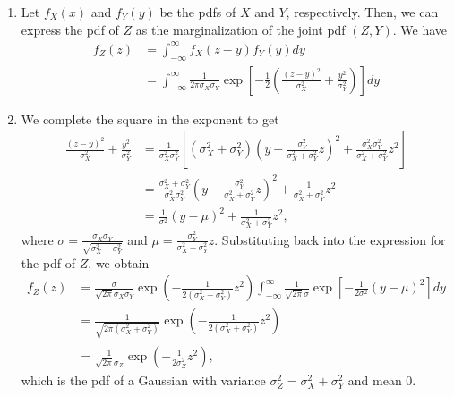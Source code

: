 \documentclass[submit]{harvardml}
\begin{document}
\begin{enumerate}[label=(\alph*)]
	\item Let $f_X(x)$ and $f_Y(y)$ be the pdfs of $X$ and $Y$, respectively. Then, we can express the pdf of $Z$ as the marginalization of the joint pdf $(Z, Y)$. We have
	\begin{align*}
	f_Z(z) &= \int_{-\infty}^{\infty} f_X(z - y) f_Y(y) dy \\
	&= \int_{-\infty}^{\infty} \frac{1}{2\pi\sigma_X\sigma_Y} \exp\left[ -\frac{1}{2}\left(\frac{(z - y)^2}{\sigma_X^2} + \frac{y^2}{\sigma_Y^2}\right) \right] dy
	\end{align*}
	
	\item We complete the square in the exponent to get
	\begin{align*}
	\frac{(z - y)^2}{\sigma_X^2} + \frac{y^2}{\sigma_Y^2} 
	&= \frac{1}{\sigma_X^2\sigma_Y^2}\left[(\sigma_X^2 + \sigma_Y^2) (y - \frac{\sigma_Y^2}{\sigma_X^2 + \sigma_Y^2} z)^2 + \frac{\sigma_X^2\sigma_Y^2}{\sigma_X^2 + \sigma_Y^2} z^2\right] \\
	&= \frac{\sigma_X^2 + \sigma_Y^2}{\sigma_X^2\sigma_Y^2} (y - \frac{\sigma_Y^2}{\sigma_X^2 + \sigma_Y^2} z)^2 + \frac{1}{\sigma_X^2 + \sigma_Y^2} z^2 \\
	&= \frac{1}{\sigma^2} (y - \mu)^2 + \frac{1}{\sigma_X^2 + \sigma_Y^2} z^2,
	\end{align*}
	where $\sigma = \frac{\sigma_X\sigma_Y}{\sqrt{\sigma_X^2 + \sigma_Y^2}}$ and $\mu = \frac{\sigma_Y^2}{\sigma_X^2 + \sigma_Y^2} z$. Substituting back into the expression for the pdf of $Z$, we obtain
	\begin{align*}
	f_Z(z) &= 
	\frac{\sigma}{\sqrt{2\pi}\sigma_X\sigma_Y} \exp\left(-\frac{1}{2(\sigma_X^2 + \sigma_Y^2)} z^2\right)
	\int_{-\infty}^{\infty} \frac{1}{\sqrt{2\pi}\sigma} \exp\left[ -\frac{1}{2\sigma^2} (y - \mu)^2\right] dy \\
	&= \frac{1}{\sqrt{2\pi(\sigma_X^2 + \sigma_Y^2)}} \exp\left(-\frac{1}{2(\sigma_X^2 + \sigma_Y^2)} z^2\right) \\
	&= \frac{1}{\sqrt{2\pi}\sigma_Z} \exp\left(-\frac{1}{2\sigma_Z^2} z^2\right),
	\end{align*}
	which is the pdf of a Gaussian with variance $\sigma_Z^2 = \sigma_X^2 + \sigma_Y^2$ and mean 0.
	

\end{enumerate}
\end{document}
